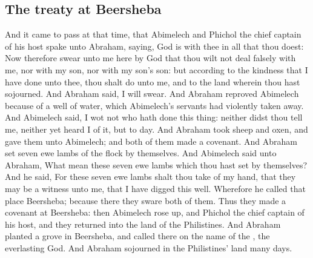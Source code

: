 \begin{biblechapter}
\section*{The treaty at Beersheba}
\verse And it came to pass at that time, that Abimelech and Phichol the chief captain of his host spake unto Abraham, saying, God is with thee in all that thou doest:
\verse Now therefore swear unto me here by God that thou wilt not deal falsely with me, nor with my son, nor with my son's son: but according to the kindness that I have done unto thee, thou shalt do unto me, and to the land wherein thou hast sojourned.
\verse And Abraham said, I will swear.
\verse And Abraham reproved Abimelech because of a well of water, which Abimelech's servants had violently taken away.
\verse And Abimelech said, I wot not who hath done this thing: neither didst thou tell me, neither yet heard I of it, but to day.
\verse And Abraham took sheep and oxen, and gave them unto Abimelech; and both of them made a covenant.
\verse And Abraham set seven ewe lambs of the flock by themselves.
\verse And Abimelech said unto Abraham, What mean these seven ewe lambs which thou hast set by themselves?
\verse And he said, For these seven ewe lambs shalt thou take of my hand, that they may be a witness unto me, that I have digged this well.
\verse Wherefore he called that place Beersheba; because there they sware both of them.
\verse Thus they made a covenant at Beersheba: then Abimelech rose up, and Phichol the chief captain of his host, and they returned into the land of the Philistines.
\verse And Abraham planted a grove in Beersheba, and called there on the name of the \LORD, the everlasting God.
\verse And Abraham sojourned in the Philistines' land many days.
\end{biblechapter}

